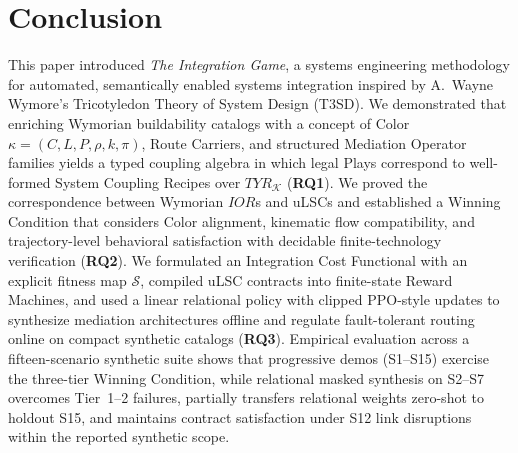 \section{Conclusion} \label{sec:conclusion}

This paper introduced \emph{The Integration Game}, a systems engineering methodology for automated, semantically enabled systems integration inspired by A.~Wayne Wymore's Tricotyledon Theory of System Design (T3SD).  We demonstrated that enriching Wymorian buildability catalogs with a concept of Color $\kappa = (C, L, P, \rho, k, \pi)$, Route Carriers, and structured Mediation Operator families yields a typed coupling algebra in which legal Plays correspond to well-formed System Coupling Recipes over $TYR_{\mathcal{K}}$ (\textbf{RQ1}).  We proved the correspondence between Wymorian $IOR$s and uLSCs and established a Winning Condition that considers Color alignment, kinematic flow compatibility, and trajectory-level behavioral satisfaction with decidable finite-technology verification (\textbf{RQ2}).  We formulated an Integration Cost Functional with an explicit fitness map $\mathcal{S}$, compiled uLSC contracts into finite-state Reward Machines, and used a linear relational policy with clipped PPO-style updates to synthesize mediation architectures offline and regulate fault-tolerant routing online on compact synthetic catalogs (\textbf{RQ3}).  Empirical evaluation across a fifteen-scenario synthetic suite shows that progressive demos (S1--S15) exercise the three-tier Winning Condition, while relational masked synthesis on S2--S7 overcomes Tier~1--2 failures, partially transfers relational weights zero-shot to holdout S15, and maintains contract satisfaction under S12 link disruptions within the reported synthetic scope.
